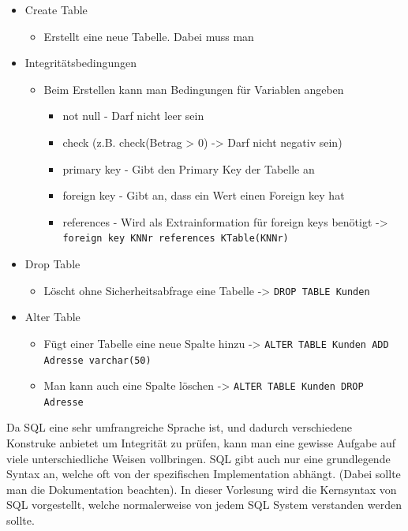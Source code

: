 \documentclass{article}
\begin{document}
 	\begin{itemize}
 		\item{Create Table}
 		\begin{itemize}
 			\item{Erstellt eine neue Tabelle. Dabei muss man}
 		\end{itemize}
 		\item{Integritätsbedingungen}
 		\begin{itemize}
 			\item{Beim Erstellen kann man Bedingungen für Variablen angeben}
 			\begin{itemize}
 				\item{not null - Darf nicht leer sein}
 				\item{check (z.B. check(Betrag > 0) -> Darf nicht negativ sein)}
 				\item{primary key - Gibt den Primary Key der Tabelle an}
 				\item{foreign key - Gibt an, dass ein Wert einen Foreign key hat}
 				\item{references - Wird als Extrainformation für foreign keys benötigt -> \verb|foreign key KNNr references KTable(KNNr)|}
 			\end{itemize}
 		\end{itemize}
 		\item{Drop Table}
 		\begin{itemize}
 			\item{Löscht ohne Sicherheitsabfrage eine Tabelle -> \verb|DROP TABLE Kunden|}
 		\end{itemize}
 		\item{Alter Table}
 		\begin{itemize}
 			\item{Fügt einer Tabelle eine neue Spalte hinzu -> \verb|ALTER TABLE Kunden ADD Adresse varchar(50)|}
 			\item{Man kann auch eine Spalte löschen -> \verb|ALTER TABLE Kunden DROP Adresse|}
 		\end{itemize}
 	\end{itemize}
 	Da SQL eine sehr umfrangreiche Sprache ist, und dadurch verschiedene Konstruke anbietet um Integrität zu prüfen, kann man eine gewisse Aufgabe auf viele unterschiedliche Weisen vollbringen. SQL gibt auch nur eine grundlegende Syntax an, welche oft von der spezifischen Implementation abhängt. (Dabei sollte man die Dokumentation beachten). In dieser Vorlesung wird die Kernsyntax von SQL vorgestellt, welche normalerweise von jedem SQL System verstanden werden sollte. \\
\end{document}
